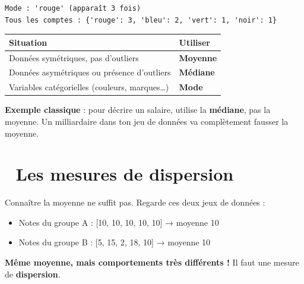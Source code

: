 \documentclass[
  french,
  11pt,
  a4paper,
]{scrbook}
\newcounter{none} %
\providecommand{\tightlist}{%
  \setlength{\itemsep}{0pt}\setlength{\parskip}{0pt}}
\begin{document}
\begin{verbatim}
Mode : 'rouge' (apparaît 3 fois)
Tous les comptes : {'rouge': 3, 'bleu': 2, 'vert': 1, 'noir': 1}
\end{verbatim}

\begin{tcolorbox}[enhanced jigsaw, arc=.35mm, bottomrule=.15mm, bottomtitle=1mm, breakable, colback=white, colbacktitle=quarto-callout-tip-color!10!white, colframe=quarto-callout-tip-color-frame, coltitle=black, left=2mm, leftrule=.75mm, opacityback=0, opacitybacktitle=0.6, rightrule=.15mm, title=\textcolor{quarto-callout-tip-color}{\faLightbulb}\hspace{0.5em}{🧠 Quand utiliser quoi ?}, titlerule=0mm, toprule=.15mm, toptitle=1mm]

{\def\LTcaptype{none} %
\begin{longtable}[]{@{}ll@{}}
\toprule\noalign{}
Situation & Utiliser \\
\midrule\noalign{}
\endhead
\bottomrule\noalign{}
\endlastfoot
Données symétriques, pas d'outliers & \textbf{Moyenne} \\
Données asymétriques ou présence d'outliers & \textbf{Médiane} \\
Variables catégorielles (couleurs, marques\ldots) & \textbf{Mode} \\
\end{longtable}
}

\textbf{Exemple classique} : pour décrire un salaire, utilise la
\textbf{médiane}, pas la moyenne. Un milliardaire dans ton jeu de
données va complètement fausser la moyenne.

\end{tcolorbox}

\section{📏 Les mesures de dispersion}\label{les-mesures-de-dispersion}

Connaître la moyenne ne suffit pas. Regarde ces deux jeux de données :

\begin{itemize}
\tightlist
\item
  Notes du groupe A : {[}10, 10, 10, 10, 10{]} → moyenne 10
\item
  Notes du groupe B : {[}5, 15, 2, 18, 10{]} → moyenne 10
\end{itemize}

\textbf{Même moyenne, mais comportements très différents !} Il faut une
mesure de \textbf{dispersion}.
\end{document}
